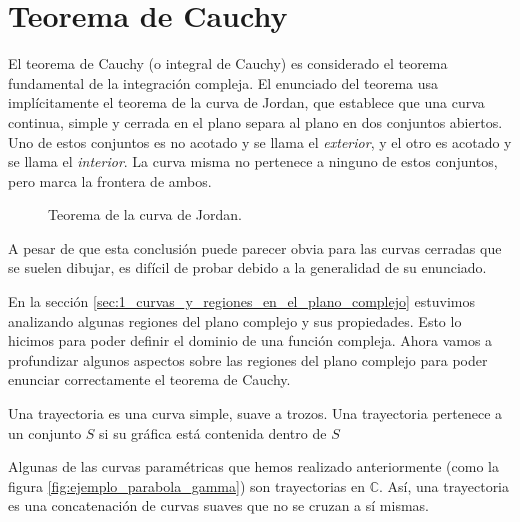 \section{Teorema de Cauchy}

El teorema de Cauchy (o integral de Cauchy) es considerado el teorema fundamental de la integración compleja. El enunciado del teorema usa implícitamente el teorema de la curva de Jordan, que establece que una curva continua, simple y cerrada en el plano separa al plano en dos conjuntos abiertos. Uno de estos conjuntos es no acotado y se llama el \textit{exterior}, y el otro es acotado y se llama el \textit{interior}. La curva misma no pertenece a ninguno de estos conjuntos, pero marca la frontera de ambos.

\begin{figure}[ht]
  \centering
  \caption{Teorema de la curva de Jordan.}
\end{figure}

A pesar de que esta conclusión puede parecer obvia para las curvas cerradas que se suelen dibujar, es difícil de probar debido a la generalidad de su enunciado. 

En la sección \ref{sec:1_curvas_y_regiones_en_el_plano_complejo} estuvimos analizando algunas regiones del plano complejo y sus propiedades. Esto lo hicimos para poder definir el dominio de una función compleja. Ahora vamos a profundizar algunos aspectos sobre las regiones del plano complejo para poder enunciar correctamente el teorema de Cauchy.

\begin{definition}[Trayectoria]
  Una trayectoria es una curva simple, suave a trozos. Una trayectoria pertenece a un conjunto $S$ si su gráfica está contenida dentro de $S$
\end{definition}

Algunas de las curvas paramétricas que hemos realizado anteriormente (como la figura \ref{fig:ejemplo_parabola_gamma}) son trayectorias en $\mathbb{C}$. Así, una trayectoria es una concatenación de curvas suaves que no se cruzan a sí mismas.

